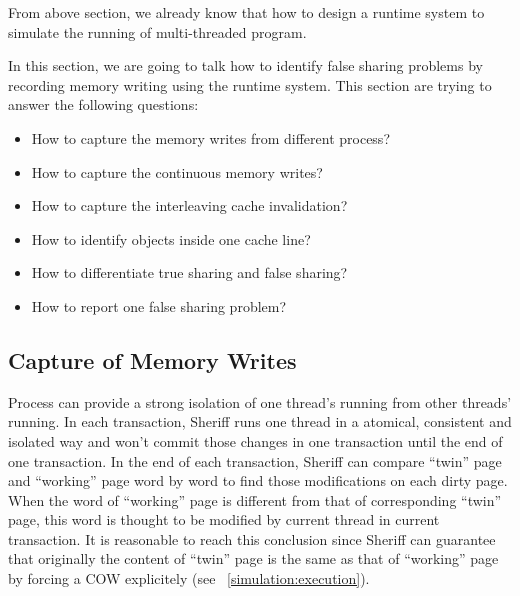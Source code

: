 From above section, we already know that how to design a runtime system to simulate the running 
of multi-threaded program. 

In this section, we are going to talk how to identify false sharing problems by recording memory writing using
the runtime system.
This section are trying to answer the following questions:

\begin{itemize}
\item How to capture the memory writes from different process?
\item How to capture the continuous memory writes?
\item How to capture the interleaving cache invalidation? 
\item How to identify objects inside one cache line? 
\item How to differentiate true sharing and false sharing?
\item How to report one false sharing problem?
\end{itemize}

\subsection{Capture of Memory Writes}
\label{falseshare:memorywrites}
Process can provide a strong isolation of one thread's running from other threads' running. 
In each transaction, Sheriff runs one thread in a atomical, consistent and isolated way and
won't commit those changes in one transaction until the end of one transaction.
In the end of each transaction, Sheriff can compare ``twin'' page and ``working'' page word by word to find 
those modifications on each dirty page. When the word of ``working'' page is different from that of 
corresponding ``twin'' page, this word is thought to be modified by current thread in current transaction. 
It is reasonable to reach this conclusion since Sheriff can guarantee that originally the content of ``twin'' page 
is the same as that of ``working'' page by forcing a COW explicitely (see ~\ref{simulation:execution}).
\begin{comment}
It is true that the writing of ``A-B-A''  can be missed by simply comparison,
but we believe that ``A-B-A'' writing in one transaction
is not frequent and won't bring any correctness problem.
We don't want to put too much focus on this point.
\end{comment}

